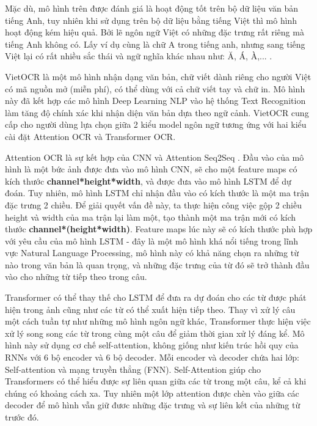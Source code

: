 Mặc dù, mô hình trên được đánh giá là hoạt động tốt trên bộ dữ liệu văn bản tiếng Anh, tuy
nhiên khi sử dụng trên bộ dữ liệu bằng tiếng Việt thì mô hình hoạt động kém hiệu quả. Bởi
lẽ ngôn ngữ Việt có những đặc trưng rất riêng mà tiếng Anh không có. Lấy ví dụ cùng là chữ
A trong tiếng anh, nhưng sang tiếng Việt lại có rất nhiều sắc thái và ngữ nghĩa khác nhau
như: Ă, Á, À,... .

VietOCR \cite{VietOCR} là một mô hình nhận dạng văn bản, chữ viết dành riêng cho người Việt có mã
nguồn mở (miễn phí), có thể dùng với cả chữ viết tay và chữ in. Mô hình này đã kết hợp các
mô hình Deep Learning NLP vào hệ thống Text Recognition làm tăng độ chính xác khi nhận
diện văn bản dựa theo ngữ cảnh. VietOCR cung cấp cho người dùng lựa chọn giữa 2 kiểu
model ngôn ngữ tương ứng với hai kiểu cài đặt Attention OCR và Transformer OCR.

Attention OCR \cite{VietOCR} là sự kết hợp của CNN và Attention Seq2Seq \cite{galassi2020attention}. Đầu vào của mô hình là một
bức ảnh được đưa vào mô hình CNN, sẽ cho một feature maps có kích thước
\textbf{channel*height*width}, và được đưa vào mô hình LSTM để dự đoán. Tuy nhiên, mô hình
LSTM chỉ nhận đầu vào có kích thước là một ma trận đặc trưng 2 chiều. Để giải quyết vấn
đề này, ta thực hiện công việc gộp 2 chiều height và width của ma trận lại làm một, tạo
thành một ma trận mới có kích thước \textbf{channel*(height*width)}. Feature maps lúc này sẽ có
kích thước phù hợp với yêu cầu của mô hình LSTM - đây là một mô hình khá nổi tiếng trong
lĩnh vực Natural Language Processing, mô hình này có khả năng chọn ra những từ nào
trong văn bản là quan trọng, và những đặc trưng của từ đó sẽ trở thành đầu vào cho những
từ tiếp theo trong câu.

Transformer \cite{gillioz2020overview} có thể thay thế cho LSTM để đưa ra dự đoán cho các từ được phát hiện trong
ảnh cũng như các từ có thể xuất hiện tiếp theo. Thay vì xử lý câu một cách tuần tự như
những mô hình ngôn ngữ khác, Transformer thực hiện việc xử lý song song các từ trong
cùng một câu để giảm thời gian xử lý đáng kể. Mô hình này sử dụng cơ chế self-attention,
không giống như kiến trúc hồi quy của RNNs với 6 bộ encoder và 6 bộ decoder. Mỗi
encoder và decoder chứa hai lớp: Self-attention và mạng truyền thẳng (FNN). Self-Attention
giúp cho Transformers có thể hiểu được sự liên quan giữa các từ trong một câu, kể cả khi
chúng có khoảng cách xa. Tuy nhiên một lớp attention được chèn vào giữa các decoder để
mô hình vẫn giữ đươc những đặc trưng và sự liên kết của những từ trước đó.

